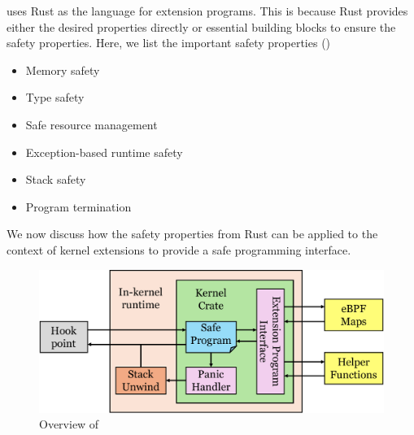 \projname{} uses Rust as the language for extension programs.
This is because Rust provides either the desired properties directly or
    essential building blocks to ensure the safety properties.
Here, we list the important safety properties ()
\begin{itemize}
    \item Memory safety
    \item Type safety
    \item Safe resource management
    \item Exception-based runtime safety
    \item Stack safety
    \item Program termination
\end{itemize}


We now discuss how the safety properties from Rust can be applied to the
    context of kernel extensions to provide a safe programming interface.

\begin{figure}
    \includegraphics[width=1.0\linewidth]{figs/overview.pdf}
    \centering
    \vspace{-10pt}
    \caption{Overview of \projname{}}
    \label{fig:rex-overview}
    \vspace{-10pt}
\end{figure}

